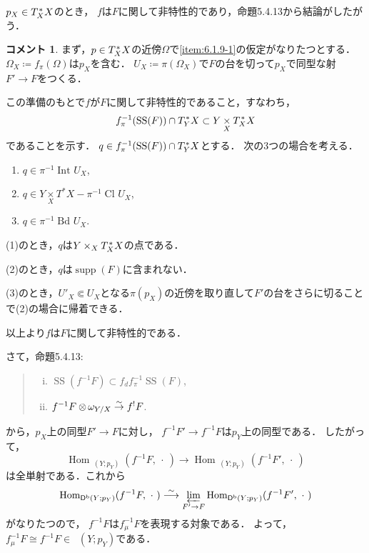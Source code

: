 \documentclass[leqno, 10pt, a4paper, dvipdfmx]{jsarticle}
\makeatletter
\theoremstyle{definition}
\newcommand{\Hom}{\mathop{\mathrm{Hom}}\nolimits} %
\renewenvironment{proof}[1][\proofname]{\par
  \pushQED{\qed}%
  \normalfont \topsep6\p@\@plus6\p@\relax
  \trivlist
  \item[\hskip\labelsep
         \bfseries
    {#1}]\ignorespaces
}{%
  \popQED\endtrivlist\@endpefalse
}
\renewcommand{\proofname}{証明.}
\numberwithin{equation}{section}
\newcommand{\supp}{\mathop{\mathrm{supp}}\nolimits}
\newcommand{\Dompb}{\mathop{\mathsf{D}^\mathrm{b}}\nolimits}
\newcommand{\muS}{\mathop{\mathrm{SS}}\nolimits}
\newcommand{\simar}{\mathrel{\overset{\sim}{\rightarrow}}}%
\newcommand{\simarr}{\mathrel{\overset{\sim}{\longrightarrow}}}%
\newcommand{\prolim}[1][]{\mathop{\varprojlim}\limits_{#1}}
\newcommand{\tens}[1][]{\mathbin{\otimes_{\raise1.5ex\hbox to-.1em{}{#1}}}}
\newcommand{\blk}{\mathord{\ \cdot\ }}
\newcommand{\dpb}[1][]{\mathbin{\mathop{\times}\limits_{#1}}}
\newcommand{\tpb}[1][]{\mathbin{\mathop{\times}\nolimits_{#1}}}
\theoremstyle{mystyle}
\newtheorem{CMT}[AXM]{コメント}
\newcommand{\Int}[1][]{\mathop{\mathrm{Int}}\nolimits_{#1}}
\newcommand{\Cl}[1][]{\mathop{\mathrm{Cl}}\nolimits_{#1}}
\newcommand{\Bd}[1][]{\mathop{\mathrm{Bd}}\nolimits_{#1}}
\newcommand{\mpb}[1][]{{#1}_{\pi}} %
\newcommand{\mdiff}[1][]{{#1}_{d}} %
\newcommand{\muinv}[1][]{{#1}_{\mu}^{-1}} %
\newcommand{\cotb}[1][]{T^{\ast}{#1}}
\newcommand{\conm}[2][]{T_{#1}^{\hspace{0.7pt}\ast}{#2}}
\makeatother
\begin{document}
\begin{proof}
    \(p_X\in \conm[X]{X}\)のとき，
    \(f\)は\(F\)に関して非特性的であり，命題5.4.13から結論がしたがう．
    \begin{CMT}
        まず，\(p\in \conm[X]{X}\)の近傍\(\varOmega\)で\eqref{item:6.1.9-1}の仮定がなりたつとする．
        \(\varOmega_X\coloneqq \mpb[f](\varOmega)\)は\(p_X\)を含む．
        \(U_X\coloneqq \pi(\varOmega_X)\)で\(F\)の台を切って\(p_X\)で同型な射\(F'\to F\)をつくる．
        
        この準備のもとで\(f\)が\(F\)に関して非特性的であること，すなわち，
        \[
            \mpb[f]^{-1}(\muS(F))\cap\conm[Y]{X}\subset Y\dpb[X]\conm[X]{X}
        \]であることを示す．
        \(q\in \mpb[f]^{-1}(\muS(F))\cap\conm[Y]{X}\)とする．
        次の3つの場合を考える．
        \begin{enumerate}[(1)]
            \item \(q\in \pi^{-1}\Int[]U_X\),
            \item \(q\in Y\dpb[X]\cotb[X]-\pi^{-1}\Cl[]U_X\),
            \item \(q\in \pi^{-1}\Bd[]U_X\).
        \end{enumerate}
        
        (1)のとき，\(q\)は\(Y\tpb[X]\conm[X]{X}\)の点である．
        
        (2)のとき，\(q\)は\(\supp(F)\)に含まれない．
        
        (3)のとき，\(U'_X\Subset U_X\)となる\(\pi(p_X)\)の近傍を取り直して\(F'\)の台をさらに切ることで(2)の場合に帰着できる．

        以上より\(f\)は\(F\)に関して非特性的である．

        さて，命題5.4.13:
        \begin{quote}
            \begin{enumerate}[(i)]
                \item \(\muS(f^{-1}F)\subset \mdiff[f]\mpb[f]^{-1}\muS(F)\),
                \item \(f^{-1}F\tens[]\omega_{Y/X}\simar f^{!}F\).
            \end{enumerate}
        \end{quote}
        から，\(p_X\)上の同型\(F'\to F\)に対し，
        \(f^{-1}F'\to f^{-1}F\)は\(p_Y\)上の同型である．
        したがって，\[
            \Hom_{\Dompb(Y;p_Y)}(f^{-1}F,\blk)
            \to
            \Hom_{\Dompb(Y;p_Y)}(f^{-1}F',\blk)
        \]は全単射である．これから
        \[
            \Hom_{\Dompb(Y;p_Y)}(f^{-1}F,\blk)
            \simarr
            \prolim[F'\to F]\Hom_{\Dompb(Y;p_Y)}(f^{-1}F',\blk)
        \]
        がなりたつので，
        \(f^{-1}F\)は\(\muinv[f]F\)を表現する対象である．
        よって，\(\muinv[f]F\cong f^{-1}F\in \Dompb(Y;p_Y)\)である．
    \end{CMT}


\end{proof}
\end{document}
